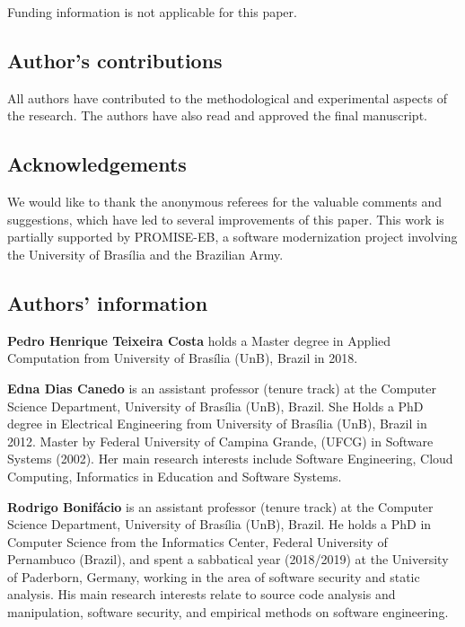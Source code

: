\documentclass[AMA,STIX1COL]{WileyNJD-v2}
\begin{document}
Funding information is not applicable for this paper.


\subsection{Author's contributions}

All authors have contributed to the methodological and experimental aspects
of the research. The authors have also read and approved the final manuscript. 

\subsection{Acknowledgements}

We would like to thank the anonymous referees for the valuable comments and suggestions, which have led to several improvements of this paper. This work is partially supported by \textsc{PROMISE-EB}, a software modernization project involving the University of Bras\'{i}lia and the Brazilian Army.
  
\subsection{Authors' information}

\textbf{Pedro Henrique Teixeira Costa} holds a Master degree in Applied Computation from University of Bras\'{i}lia (UnB), Brazil in 2018.

\textbf{Edna Dias Canedo} is an assistant professor (tenure track) at the Computer Science Department, University of Bras\'{i}lia (UnB), Brazil. She Holds a PhD degree in Electrical Engineering from University of Bras\'{i}lia (UnB), Brazil in 2012. Master by Federal University of Campina Grande, (UFCG) in Software Systems (2002). Her main research interests include Software Engineering, Cloud Computing, Informatics in Education and Software Systems.

\textbf{Rodrigo Bonif\'{a}cio} is an assistant professor (tenure track) at the Computer Science Department, University of Bras\'{i}lia (UnB), Brazil. He holds a PhD in Computer Science from the Informatics Center, Federal University of Pernambuco (Brazil), and spent a sabbatical year (2018/2019) at the University of Paderborn, Germany, working in the area of software security and static analysis. His main research interests relate to source code analysis and manipulation, software security, and empirical methods on software engineering. 
\end{document}
